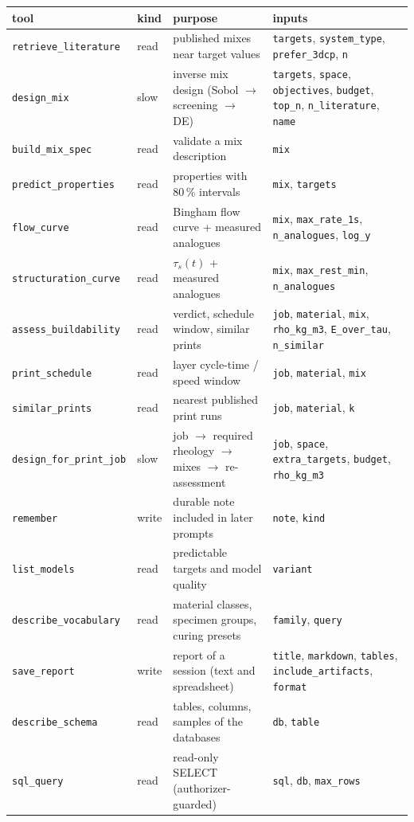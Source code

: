\begin{tabular}{@{}lp{0.8cm}p{4.9cm}p{5.4cm}@{}}
\toprule
tool & kind & purpose & inputs \\
\midrule
\texttt{retrieve\_literature} & read & published mixes near target values & \texttt{targets}, \texttt{system\_type}, \texttt{prefer\_3dcp}, \texttt{n} \\
\texttt{design\_mix} & slow & inverse mix design (Sobol $\rightarrow$ screening $\rightarrow$ DE) & \texttt{targets}, \texttt{space}, \texttt{objectives}, \texttt{budget}, \texttt{top\_n}, \texttt{n\_literature}, \texttt{name} \\
\texttt{build\_mix\_spec} & read & validate a mix description & \texttt{mix} \\
\texttt{predict\_properties} & read & properties with 80\,\% intervals & \texttt{mix}, \texttt{targets} \\
\texttt{flow\_curve} & read & Bingham flow curve + measured analogues & \texttt{mix}, \texttt{max\_rate\_1s}, \texttt{n\_analogues}, \texttt{log\_y} \\
\texttt{structuration\_curve} & read & $\tau_s(t)$ + measured analogues & \texttt{mix}, \texttt{max\_rest\_min}, \texttt{n\_analogues} \\
\texttt{assess\_buildability} & read & verdict, schedule window, similar prints & \texttt{job}, \texttt{material}, \texttt{mix}, \texttt{rho\_kg\_m3}, \texttt{E\_over\_tau}, \texttt{n\_similar} \\
\texttt{print\_schedule} & read & layer cycle-time / speed window & \texttt{job}, \texttt{material}, \texttt{mix} \\
\texttt{similar\_prints} & read & nearest published print runs & \texttt{job}, \texttt{material}, \texttt{k} \\
\texttt{design\_for\_print\_job} & slow & job $\rightarrow$ required rheology $\rightarrow$ mixes $\rightarrow$ re-assessment & \texttt{job}, \texttt{space}, \texttt{extra\_targets}, \texttt{budget}, \texttt{rho\_kg\_m3} \\
\texttt{remember} & write & durable note included in later prompts & \texttt{note}, \texttt{kind} \\
\texttt{list\_models} & read & predictable targets and model quality & \texttt{variant} \\
\texttt{describe\_vocabulary} & read & material classes, specimen groups, curing presets & \texttt{family}, \texttt{query} \\
\texttt{save\_report} & write & report of a session (text and spreadsheet) & \texttt{title}, \texttt{markdown}, \texttt{tables}, \texttt{include\_artifacts}, \texttt{format} \\
\texttt{describe\_schema} & read & tables, columns, samples of the databases & \texttt{db}, \texttt{table} \\
\texttt{sql\_query} & read & read-only SELECT (authorizer-guarded) & \texttt{sql}, \texttt{db}, \texttt{max\_rows} \\
\bottomrule
\end{tabular}